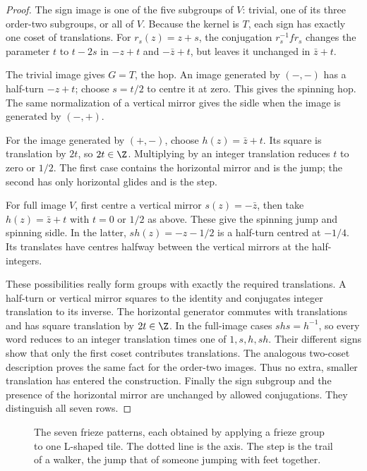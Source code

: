 \begin{proof}
The sign image is one of the five subgroups of $V$: trivial, one of its three order-two subgroups, or all of $V$. Because the kernel is $T$, each sign has exactly one coset of translations. For $r_s(z)=z+s$, the conjugation $r_s^{-1}fr_s$ changes the parameter $t$ to $t-2s$ in $-z+t$ and $-\bar z+t$, but leaves it unchanged in $\bar z+t$.

The trivial image gives $G=T$, the hop. An image generated by $(-,-)$ has a half-turn $-z+t$; choose $s=t/2$ to centre it at zero. This gives the spinning hop. The same normalization of a vertical mirror gives the sidle when the image is generated by $(-,+)$.

For the image generated by $(+,-)$, choose $h(z)=\bar z+t$. Its square is translation by $2t$, so $2t\in\Z$. Multiplying by an integer translation reduces $t$ to zero or $1/2$. The first case contains the horizontal mirror and is the jump; the second has only horizontal glides and is the step.

For full image $V$, first centre a vertical mirror $s(z)=-\bar z$, then take $h(z)=\bar z+t$ with $t=0$ or $1/2$ as above. These give the spinning jump and spinning sidle. In the latter, $sh(z)=-z-1/2$ is a half-turn centred at $-1/4$. Its translates have centres halfway between the vertical mirrors at the half-integers.

These possibilities really form groups with exactly the required translations. A half-turn or vertical mirror squares to the identity and conjugates integer translation to its inverse. The horizontal generator commutes with translations and has square translation by $2t\in\Z$. In the full-image cases $shs=h^{-1}$, so every word reduces to an integer translation times one of $1,s,h,sh$. Their different signs show that only the first coset contributes translations. The analogous two-coset description proves the same fact for the order-two images. Thus no extra, smaller translation has entered the construction. Finally the sign subgroup and the presence of the horizontal mirror are unchanged by allowed conjugations. They distinguish all seven rows.
\end{proof}

\begin{figure}[ht]
\centering
{}
\caption{The seven frieze patterns, each obtained by applying a frieze group to one L-shaped tile. The dotted line is the axis. The
step is the trail of a walker, the jump that of someone jumping with feet together.}
\label{geometry:fig:friezes}
\end{figure}

